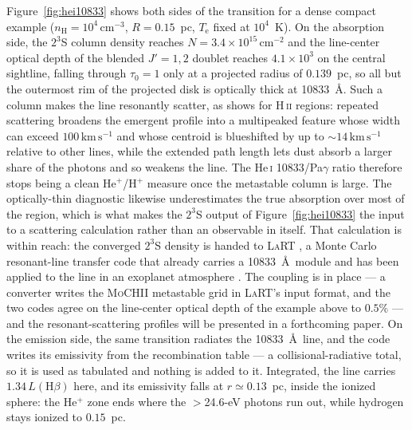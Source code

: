 \documentclass[twocolumn,linenumbers]{aastex702}
\newcommand{\MoCHII}{\textsc{MoCHII}}
\newcommand{\HII}{H\,\textsc{ii}}
\newcommand{\Te}{T_{\mathrm{e}}}
\newcommand{\nH}{n_{\mathrm{H}}}
\begin{document}
Figure~\ref{fig:hei10833} shows both sides of the transition for a dense
compact example ($\nH = 10^4\,\mathrm{cm^{-3}}$, $R = 0.15$~pc, $\Te$ fixed
at $10^4$~K).  On the absorption side, the $2^3$S column density reaches
$N = 3.4\times10^{15}\,\mathrm{cm^{-2}}$ and the line-center optical depth of
the blended $J' = 1, 2$ doublet reaches $4.1\times10^{3}$ on the central
sightline, falling through $\tau_0 = 1$ only at a projected radius of
$0.139$~pc, so all but the outermost rim of the projected disk is optically
thick at 10833~\AA.  Such a column makes the line resonantly scatter, as
\citet{draine2026} shows for \HII{} regions: repeated scattering broadens the
emergent profile into a multipeaked feature whose width can exceed
$100\,\mathrm{km\,s^{-1}}$ and whose centroid is blueshifted by up to
$\sim$$14\,\mathrm{km\,s^{-1}}$ relative to other lines, while the extended
path length lets dust absorb a larger share of the photons and so weakens the
line.  The He\,\textsc{i} 10833/Pa$\gamma$ ratio therefore stops being a clean
He$^{+}$/H$^{+}$ measure once the metastable column is large.  The
optically-thin diagnostic likewise underestimates the true absorption over
most of the region, which is what makes the $2^3$S output of
Figure~\ref{fig:hei10833} the input to a scattering calculation rather than an
observable in itself.  That calculation is within reach: the converged $2^3$S
density is handed to \textsc{LaRT}
\citep{seon2020,seon2022,seon2024}, a Monte Carlo resonant-line transfer code
that already carries a 10833~\AA\ module and has been applied to the line in
an exoplanet atmosphere \citep{yan2022}.  The coupling is in place --- a
converter writes the \MoCHII{} metastable grid in \textsc{LaRT}'s input
format, and the two codes agree on the line-center optical depth of the
example above to $0.5\%$ --- and the resonant-scattering profiles will be
presented in a forthcoming paper.  On the
emission side, the same
transition radiates the 10833~\AA\ line, and the code writes its emissivity
from the \citet{porter2012} recombination table --- a collisional-radiative
total, so it is used as tabulated and nothing is added to it.  Integrated, the
line carries $1.34\,L(\mathrm{H}\beta)$ here, and its emissivity falls at
$r \simeq 0.13$~pc, inside the ionized sphere: the He$^{+}$ zone ends where
the $>$24.6-eV photons run out, while hydrogen stays ionized to $0.15$~pc.
\end{document}
